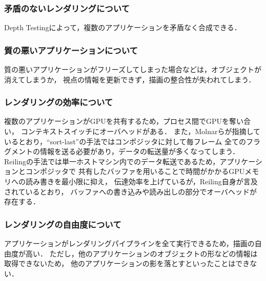 \subsubsection*{矛盾のないレンダリングについて}

Depth Testingによって，複数のアプリケーションを矛盾なく合成できる．

\subsubsection*{質の悪いアプリケーションについて}

質の悪いアプリケーションがフリーズしてしまった場合などは，オブジェクトが消えてしまうか，
視点の情報を更新できず，描画の整合性が失われてしまう．

\subsubsection*{レンダリングの効率について}

複数のアプリケーションがGPUを共有するため，プロセス間でGPUを奪い合い，
コンテキストスイッチにオーバヘッドがある．
また，Molnarらが指摘しているとおり，``sort-last''の手法ではコンポジッタに対して毎フレーム
全てのフラグメントの情報を送る必要があり，データの転送量が多くなってしまう．
Reilingの手法では単一ホストマシン内でのデータ転送であるため，アプリケーションとコンポジッタで
共有したバッファを用いることで時間がかかるGPUメモリへの読み書きを最小限に抑え，
伝達効率を上げているが，Reiling自身が言及されているとおり，
バッファへの書き込みや読み出しの部分でオーバヘッドが存在する．

\subsubsection*{レンダリングの自由度について}

アプリケーションがレンダリングパイプラインを全て実行できるため，描画の自由度が高い．
ただし，他のアプリケーションのオブジェクトの形などの情報は取得できないため，
他のアプリケーションの影を落とすといったことはできない．



